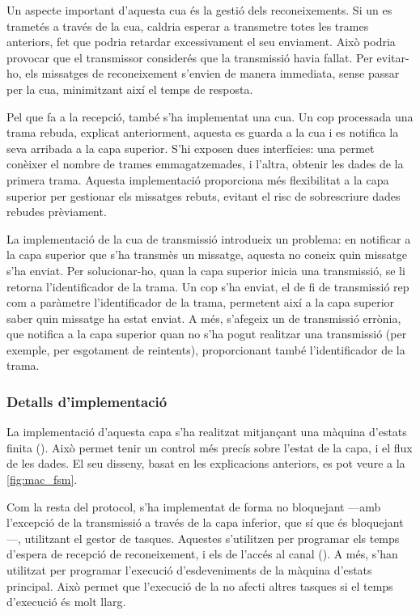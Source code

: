 \documentclass{tfgitic}[2024/07/01]
\begin{document}
Un aspecte important d'aquesta cua és la gestió dels reconeixements. Si un  es trametés a través de la cua, caldria esperar a transmetre totes les trames anteriors, fet que podria retardar excessivament el seu enviament. Això podria provocar que el transmissor considerés que la transmissió havia fallat. Per evitar-ho, els missatges de reconeixement s'envien de manera immediata, sense passar per la cua, minimitzant així el temps de resposta.

Pel que fa a la recepció, també s'ha implementat una cua. Un cop processada una trama rebuda, explicat anteriorment, aquesta es guarda a la cua i es notifica la seva arribada a la capa superior. S'hi exposen dues interfícies: una permet conèixer el nombre de trames emmagatzemades, i l'altra, obtenir les dades de la primera trama. Aquesta implementació proporciona més flexibilitat a la capa superior per gestionar els missatges rebuts, evitant el risc de sobrescriure dades rebudes prèviament.

La implementació de la cua de transmissió introdueix un problema: en notificar a la capa superior que s'ha transmès un missatge, aquesta no coneix quin missatge s'ha enviat. Per solucionar-ho, quan la capa superior inicia una transmissió, se li retorna l'identificador de la trama. Un cop s'ha enviat, el  de fi de transmissió rep com a paràmetre l'identificador de la trama, permetent així a la capa superior saber quin missatge ha estat enviat. A més, s'afegeix un  de transmissió errònia, que notifica a la capa superior quan no s'ha pogut realitzar una transmissió (per exemple, per esgotament de reintents), proporcionant també l'identificador de la trama.
\subsubsection{Detalls d'implementació}
La implementació d'aquesta capa s'ha realitzat mitjançant una màquina d'estats finita (). Això permet tenir un control més precís sobre l'estat de la capa, i el flux de les dades. El seu disseny, basat en les explicacions anteriors, es pot veure a la \autoref{fig:mac_fsm}.

Com la resta del protocol, s'ha implementat de forma no bloquejant ---amb l'excepció de la transmissió a través de la capa inferior, que sí que és bloquejant---, utilitzant el gestor de tasques. Aquestes s'utilitzen per programar els temps d'espera de recepció de reconeixement, i els de l'accés al canal (). A més, s'han utilitzat per programar l'execució d'esdeveniments de la màquina d'estats principal. Això permet que l'execució de la  no afecti altres tasques si el temps d'execució és molt llarg.
\end{document}
